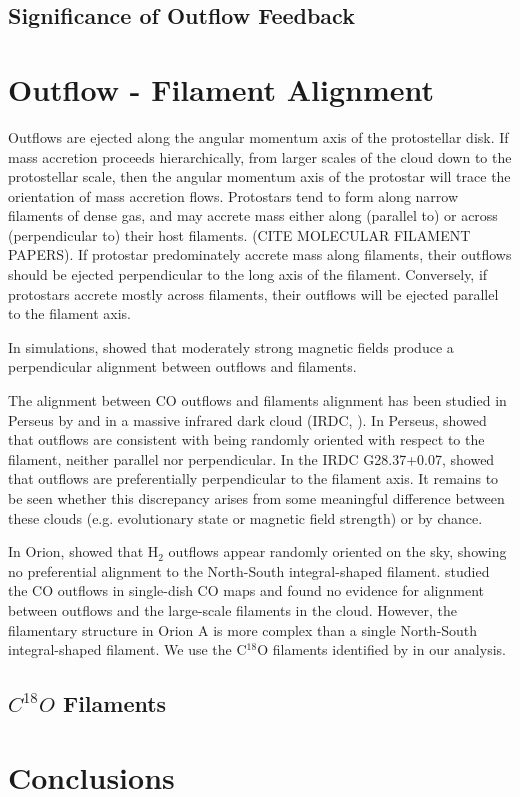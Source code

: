 \documentclass[twocolumn]{aastex62}
\begin{document}
\subsection{Significance of Outflow Feedback }



\section{Outflow - Filament Alignment}
Outflows are ejected along the angular momentum axis of the protostellar disk. If mass accretion proceeds hierarchically, from larger scales of the cloud down to the protostellar scale, then the angular momentum axis of the protostar will trace the orientation of mass accretion flows. Protostars tend to form along narrow filaments of dense gas, and may accrete mass either along (parallel to) or across (perpendicular to) their host filaments. (CITE MOLECULAR FILAMENT PAPERS). If protostar predominately accrete mass along filaments, their outflows should be ejected perpendicular to the long axis of the filament. Conversely, if protostars accrete mostly across filaments, their outflows will be ejected parallel to the filament axis. 


In simulations, \citet{Li18} showed that moderately strong magnetic fields produce a perpendicular alignment between outflows and filaments. 

The alignment between CO outflows  and filaments alignment has been studied in Perseus by \citet{Stephens17} and in a massive infrared dark cloud (IRDC, \citealp{Kong19}). In Perseus, \citet{Stephens17} showed that outflows are consistent with being randomly oriented with respect to the filament, neither parallel nor perpendicular. In the IRDC G28.37+0.07, \cite{Kong19} showed that outflows are preferentially perpendicular to the filament axis. It remains to be seen whether this discrepancy arises from some meaningful difference between these clouds (e.g. evolutionary state or magnetic field strength) or by chance. 

In Orion, \citet{Davis09} showed that H$_{2}$ outflows appear randomly oriented on the sky, showing no preferential alignment to the North-South integral-shaped filament. \citet{Tanabe19} studied the CO outflows in single-dish CO maps and found no evidence for alignment between outflows and the large-scale filaments in the cloud. However, the filamentary structure in Orion A is more complex than a single North-South integral-shaped filament. We use the C$^{18}$O filaments identified by \citet{Suri19} in our analysis.

\subsection{$C^{18}O$ Filaments}





\section{Conclusions}



\end{document}
